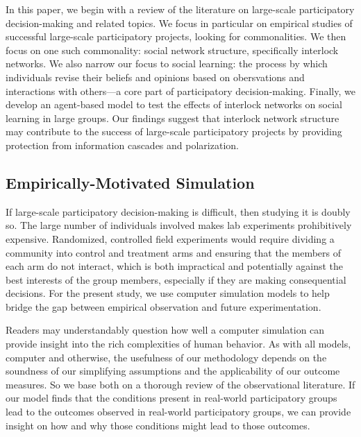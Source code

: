 \documentclass[manuscript,screen,review,acmsmall]{acmart}
\begin{document}
In this paper, we begin with a review of the literature on large-scale participatory decision-making and related topics.
We focus in particular on empirical studies of successful large-scale participatory projects, looking for commonalities.
We then focus on one such commonality: social network structure,
specifically interlock networks.
We also narrow our focus to social learning:
the process by which individuals revise their beliefs and opinions
based on obersvations and interactions with others---a
core part of participatory decision-making.
Finally, we develop an agent-based model
to test the effects of interlock networks on social learning
in large groups.
Our findings suggest that interlock network structure may contribute to the success of large-scale participatory projects by providing protection from information cascades and polarization.

\subsection{Empirically-Motivated Simulation}

If large-scale participatory decision-making is difficult,
then studying it is doubly so.
The large number of individuals involved makes lab experiments prohibitively expensive.
Randomized, controlled field experiments would require dividing
a community into control and treatment arms
and ensuring that the members of each
arm do not interact,
which is both impractical and potentially
against the best interests of the group members,
especially if they are making consequential decisions.
For the present study, we use computer simulation models to help bridge the gap
between empirical observation and future experimentation.

Readers may understandably question how well a computer simulation can provide insight into the rich complexities of human behavior.
As with all models, computer and otherwise,
the usefulness of our methodology depends on the soundness of our simplifying assumptions and the applicability of our outcome measures.
So we base both on a thorough review of the observational literature.
If our model finds that the conditions present in real-world participatory groups lead to the outcomes observed in real-world participatory groups,
we can provide insight on how and why those conditions might lead to those outcomes.
\end{document}
